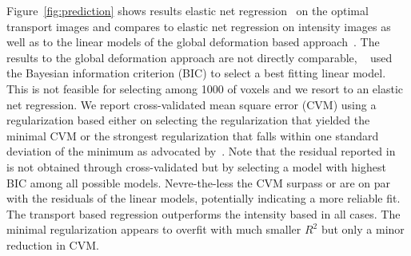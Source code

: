 \documentclass{llncs}
\begin{document}
Figure~\ref{fig:prediction} shows results elastic
net regression~\citep{Zou05regularizationand} on the optimal transport images
and compares to elastic net regression on intensity images as well as to the
linear models of the global deformation based
approach~\citep{gerber2010manifold}. The results to the global deformation
approach are not directly comparable, ~\citet{gerber2010manifold} used the
Bayesian information criterion (BIC) to select a best fitting linear model.
This is not feasible for selecting among 1000 of voxels and we resort to an
elastic net regression. We report cross-validated mean square error (CVM) using
a regularization based either on selecting the regularization that yielded the
minimal CVM or the strongest regularization that falls within one standard
deviation of the minimum as advocated by~\citep{Zou05regularizationand}. Note
that the residual reported in~\citep{gerber2010manifold} is not obtained
through cross-validated but by selecting a model with highest BIC among all
possible models. Nevre-the-less the CVM surpass or are on par with the
residuals of the linear models, potentially indicating a more reliable fit. The
transport based regression outperforms the intensity based in all cases. The
minimal regularization appears to overfit with much smaller $R^2$ but only a
minor reduction in CVM.  
\end{document}
